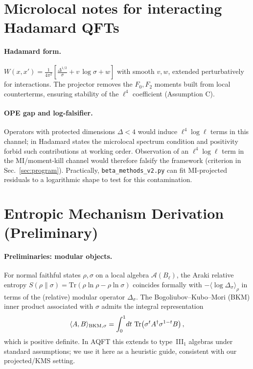 \documentclass[aps,prd,onecolumn,superscriptaddress,nofootinbib]{revtex4-2}
\begin{document}
\section{Microlocal notes for interacting Hadamard QFTs}
\label{app:microlocal}
\paragraph{Hadamard form.}
\(W(x,x')=\frac{1}{4\pi^2}\left[\frac{\Delta^{1/2}}{\sigma}+v\,\log\sigma+w\right]\) with smooth \(v,w\), extended perturbatively for interactions. The projector removes the \(F_0,F_2\) moments built from local counterterms, ensuring stability of the \(\ell^4\) coefficient (Assumption C).

\paragraph{OPE gap and log-falsifier.}
Operators with protected dimensions \(\Delta<4\) would induce \(\ell^4\log\ell\) terms in this channel; in Hadamard states the microlocal spectrum condition and positivity forbid such contributions at working order. Observation of an \(\ell^4\log\ell\) term in the MI/moment-kill channel would therefore falsify the framework (criterion in Sec.~\ref{sec:program}). Practically, \texttt{beta\_methods\_v2.py} can fit MI-projected residuals to a logarithmic shape to test for this contamination.

\section{Entropic Mechanism Derivation (Preliminary)}
\label{app:entropic-proof}

\paragraph{Preliminaries: modular objects.}
For normal faithful states \(\rho,\sigma\) on a local algebra \(\mathcal A(B_\ell)\), the Araki relative entropy
\(S(\rho\|\sigma)=\mathrm{Tr}(\rho\ln\rho-\rho\ln\sigma)\) coincides formally with \(-\langle \log\Delta_\sigma\rangle_\rho\) in terms of the (relative) modular operator \(\Delta_\sigma\). The Bogoliubov--Kubo--Mori (BKM) inner product associated with \(\sigma\) admits the integral representation
\[
\langle A,B\rangle_{\rm BKM,\sigma}=\int_0^1\!dt~\mathrm{Tr}\!\left(\sigma^t A^\dagger \sigma^{1-t}B\right),
\]
which is positive definite. In AQFT this extends to type~III\(_1\) algebras under standard assumptions; we use it here as a heuristic guide, consistent with our projected/KMS setting.
\end{document}
